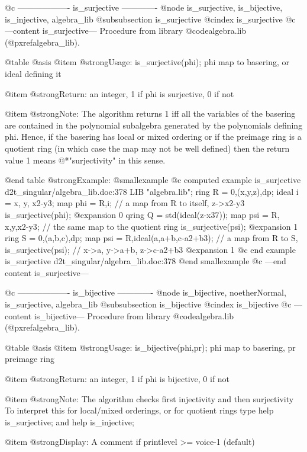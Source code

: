 @c ------------------- is_surjective -------------
@node is_surjective, is_bijective, is_injective, algebra_lib
@subsubsection is_surjective
@cindex is_surjective
@c ---content is_surjective---
Procedure from library @code{algebra.lib} (@pxref{algebra_lib}).

@table @asis
@item @strong{Usage:}
is_surjective(phi); phi map to basering, or ideal defining it

@item @strong{Return:}
an integer, 1 if phi is surjective, 0 if not

@item @strong{Note:}
The algorithm returns 1 iff all the variables of the basering are
contained in the polynomial subalgebra generated by the polynomials
defining phi. Hence, if the basering has local or mixed ordering
or if the preimage ring is a quotient ring (in which case the map
may not be well defined) then the return value 1 means
@*"surjectivity" in this sense.

@end table
@strong{Example:}
@smallexample
@c computed example is_surjective d2t_singular/algebra_lib.doc:378 
LIB "algebra.lib";
ring R = 0,(x,y,z),dp;
ideal i = x, y, x2-y3;
map phi = R,i;                    // a map from R to itself, z->x2-y3
is_surjective(phi);
@expansion{} 0
qring Q = std(ideal(z-x37));
map psi = R, x,y,x2-y3;           // the same map to the quotient ring
is_surjective(psi);
@expansion{} 1
ring S = 0,(a,b,c),dp;
map psi = R,ideal(a,a+b,c-a2+b3); // a map from R to S,
is_surjective(psi);               // x->a, y->a+b, z->c-a2+b3
@expansion{} 1
@c end example is_surjective d2t_singular/algebra_lib.doc:378
@end smallexample
@c ---end content is_surjective---

@c ------------------- is_bijective -------------
@node is_bijective, noetherNormal, is_surjective, algebra_lib
@subsubsection is_bijective
@cindex is_bijective
@c ---content is_bijective---
Procedure from library @code{algebra.lib} (@pxref{algebra_lib}).

@table @asis
@item @strong{Usage:}
is_bijective(phi,pr); phi map to basering, pr preimage ring

@item @strong{Return:}
an integer, 1 if phi is bijective, 0 if not

@item @strong{Note:}
The algorithm checks first injectivity and then surjectivity
To interpret this for local/mixed orderings, or for quotient rings
type help is_surjective; and help is_injective;

@item @strong{Display:}
A comment if printlevel >= voice-1 (default)

